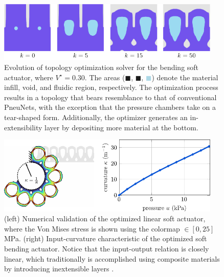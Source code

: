 \begin{figure}[!t]
\centering
\includegraphics*[width=0.95\textwidth]{./pdf/thesis-figure-3-2.pdf}
\caption{\small Evolution of topology optimization solver for the bending soft actuator, where $V^\star = 0.30$. The areas (\textcolor{matinfil}{$\blacksquare$}, \textcolor{lightvoid}{$\blacksquare$}, \textcolor{lightblue}{$\blacksquare$}) denote the material infill, void, and fluidic region, respectively. The optimization process results in a topology that bears resemblance to that of conventional PneuNets, with the exception that the pressure chambers take on a tear-shaped form. Additionally, the optimizer generates an in-extensibility layer by depositing more material at the bottom. }
\label{fig:topo_result}\end{figure}

\begin{figure}[!t]
  \centering
  \includegraphics*[width=0.95\textwidth]{./pdf/thesis-figure-3-5.pdf}
  \caption{\small (left) Numerical validation of the optimized linear soft actuator, where the Von Mises stress is shown using the colormap \protect{}$\!\!\in [0,25]$ \si{\mega \pascal}. (right) Input-curvature characteristic of the optimized soft bending actuator. Notice that the input-output relation is closely linear, which traditionally is accomplished using composite materials by introducing inextensible layers \cite{Polygerinos2013,Polygerinos2015}.}
  \label{fig:topo_result_pneunet_fem}
\end{figure}


